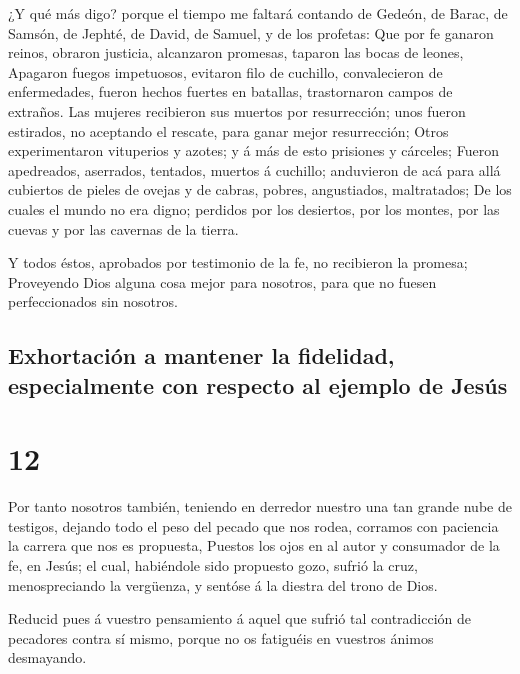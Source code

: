  ¿Y qué más digo? porque el tiempo me faltará contando de
Gedeón, de Barac, de Samsón, de Jephté, de David, de Samuel, y de los
profetas:  Que por fe ganaron reinos, obraron justicia,
alcanzaron promesas, taparon las bocas de leones, 
Apagaron fuegos impetuosos, evitaron filo de cuchillo, convalecieron de
enfermedades, fueron hechos fuertes en batallas, trastornaron campos de
extraños.  Las mujeres recibieron sus muertos por
resurrección; unos fueron estirados, no aceptando el rescate, para ganar
mejor resurrección;  Otros experimentaron vituperios y
azotes; y á más de esto prisiones y cárceles;  Fueron
apedreados, aserrados, tentados, muertos á cuchillo; anduvieron de acá
para allá cubiertos de pieles de ovejas y de cabras, pobres,
angustiados, maltratados;  De los cuales el mundo no era
digno; perdidos por los desiertos, por los montes, por las cuevas y por
las cavernas de la tierra.

 Y todos éstos, aprobados por testimonio de la fe, no
recibieron la promesa;  Proveyendo Dios alguna cosa mejor
para nosotros, para que no fuesen perfeccionados sin nosotros.

\hypertarget{exhortaciuxf3n-a-mantener-la-fidelidad-especialmente-con-respecto-al-ejemplo-de-jesuxfas}{%
\subsection{Exhortación a mantener la fidelidad, especialmente con
respecto al ejemplo de
Jesús}\label{exhortaciuxf3n-a-mantener-la-fidelidad-especialmente-con-respecto-al-ejemplo-de-jesuxfas}}

\hypertarget{section-11}{%
\section{12}\label{section-11}}

 Por tanto nosotros también, teniendo en derredor nuestro
una tan grande nube de testigos, dejando todo el peso del pecado que nos
rodea, corramos con paciencia la carrera que nos es propuesta,
 Puestos los ojos en al autor y consumador de la fe, en
Jesús; el cual, habiéndole sido propuesto gozo, sufrió la cruz,
menospreciando la vergüenza, y sentóse á la diestra del trono de Dios.

 Reducid pues á vuestro pensamiento á aquel que sufrió tal
contradicción de pecadores contra sí mismo, porque no os fatiguéis en
vuestros ánimos desmayando.

